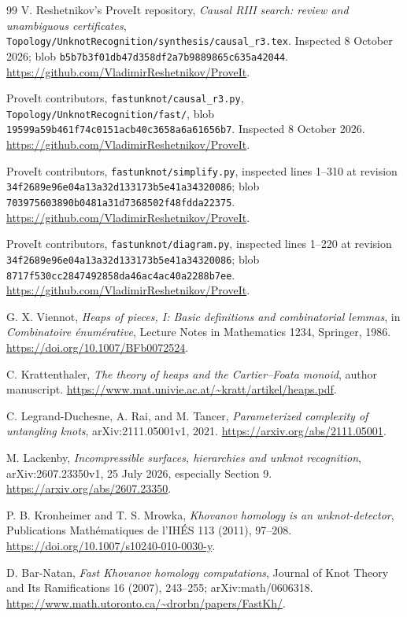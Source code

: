 \documentclass[11pt]{article}
\theoremstyle{definition}
\newcommand{\code}[1]{\texttt{#1}}
\newcommand{\repo}{\url{https://github.com/VladimirReshetnikov/ProveIt}}
\begin{document}
\begin{thebibliography}{99}
V. Reshetnikov's ProveIt repository,
\emph{Causal RIII search: review and unambiguous certificates},
\code{Topology/UnknotRecognition/synthesis/causal\_r3.tex}.
Inspected 8 October 2026; blob
\nolinkurl{b5b7b3f01db47d358df2a7b9889865c635a42044}.
\repo.

ProveIt contributors, \code{fastunknot/causal\_r3.py},
\code{Topology/UnknotRecognition/fast/}, blob
\nolinkurl{19599a59b461f74c0151acb40c3658a6a61656b7}.
Inspected 8 October 2026. \repo.

ProveIt contributors, \code{fastunknot/simplify.py}, inspected lines 1--310
at revision \nolinkurl{34f2689e96e04a13a32d133173b5e41a34320086}; blob
\nolinkurl{703975603890b0481a31d7368502f48fdda22375}.
\repo.

ProveIt contributors, \code{fastunknot/diagram.py}, inspected lines 1--220
at revision \nolinkurl{34f2689e96e04a13a32d133173b5e41a34320086}; blob
\nolinkurl{8717f530cc2847492858da46ac4ac40a2288b7ee}.
\repo.

G. X. Viennot, \emph{Heaps of pieces, I: Basic definitions and combinatorial
lemmas}, in \emph{Combinatoire \'enum\'erative}, Lecture Notes in Mathematics
1234, Springer, 1986.
\url{https://doi.org/10.1007/BFb0072524}.

C. Krattenthaler, \emph{The theory of heaps and the Cartier--Foata monoid},
author manuscript.
\url{https://www.mat.univie.ac.at/~kratt/artikel/heaps.pdf}.

C. Legrand-Duchesne, A. Rai, and M. Tancer,
\emph{Parameterized complexity of untangling knots},
arXiv:2111.05001v1, 2021.
\url{https://arxiv.org/abs/2111.05001}.

M. Lackenby, \emph{Incompressible surfaces, hierarchies and unknot
recognition}, arXiv:2607.23350v1, 25 July 2026, especially Section 9.
\url{https://arxiv.org/abs/2607.23350}.

P. B. Kronheimer and T. S. Mrowka, \emph{Khovanov homology is an
unknot-detector}, Publications Math\'ematiques de l'IH\'ES 113 (2011),
97--208. \url{https://doi.org/10.1007/s10240-010-0030-y}.

D. Bar-Natan, \emph{Fast Khovanov homology computations},
Journal of Knot Theory and Its Ramifications 16 (2007), 243--255;
arXiv:math/0606318.
\url{https://www.math.utoronto.ca/~drorbn/papers/FastKh/}.
\end{thebibliography}
\end{document}
